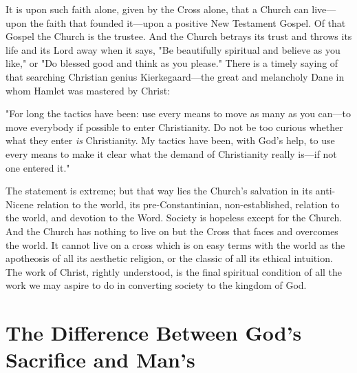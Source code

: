 \documentclass[draft]{ptfdoc}
\begin{document}
It is upon such faith alone, given by the Cross 
alone, that a Church can live---upon the faith 
that founded it---upon a positive New Testament 
Gospel. Of that Gospel the Church is 
the trustee. And the Church betrays its trust 
and throws its life and its Lord away when it 
says, "Be beautifully spiritual and believe as 
you like," or "Do blessed good and think as you 
please." 
There is a timely saying of that searching 
Christian genius Kierkegaard---the great and 
melancholy Dane in whom Hamlet was mastered 
by Christ: 

"For long the tactics have been: use every 
means to move as many as you can---to move 
everybody if possible to enter Christianity. 
Do not be too curious whether what they enter 
\textit{is} Christianity. My tactics have been, with 
God's help, to use every means to make it clear 
what the demand of Christianity really is---if 
not one entered it." 

The statement is extreme; but that way lies 
the Church's salvation in its anti-Nicene relation 
to the world, its pre-Constantinian, non-established, relation to the world, and devotion 
to the Word. Society is hopeless except for the 
Church. And the Church has nothing to live on 
but the Cross that faces and overcomes the 
world. It cannot live on a cross which is on 
easy terms with the world as the apotheosis of 
all its aesthetic religion, or the classic of all its 
ethical intuition. The work of Christ, rightly 
understood, is the final spiritual condition of all 
the work we may aspire to do in converting 
society to the kingdom of God. 



\tableofcontents

\mainmatter

\chapter{The Difference Between God's Sacrifice and Man's} 





\end{document}
